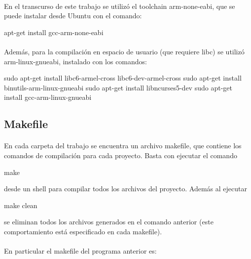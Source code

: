 \documentclass{article}
\begin{document}
\paragraph{}
En el transcurso de este trabajo se utiliz\'o el toolchain arm-none-eabi, que se puede instalar desde Ubuntu con el comando:

\begin{commandshell}
apt-get install gcc-arm-none-eabi
\end{commandshell}

\paragraph{}
Adem\'as, para la compilaci\'on en espacio de usuario (que requiere libc) se utiliz\'o arm-linux-gnueabi, instalado con los comandos:\cite{GNUEabi}

\begin{commandshell}
sudo apt-get install libc6-armel-cross libc6-dev-armel-cross
sudo apt-get install binutils-arm-linux-gnueabi
sudo apt-get install libncurses5-dev
sudo apt-get install gcc-arm-linux-gnueabi
\end{commandshell}

\subsection{Makefile}

\paragraph{}
En cada carpeta del trabajo se encuentra un archivo makefile, que contiene los comandos de compilaci\'on para cada proyecto.\cite{Makefile} Basta con ejecutar el comando

\begin{commandshell}
make
\end{commandshell}

desde un shell para compilar todos los archivos del proyecto. Adem\'as al ejecutar

\begin{commandshell}
make clean
\end{commandshell}

se eliminan todos los archivos generados en el comando anterior (este comportamiento est\'a especificado en cada makefile).

\paragraph{}
En particular el makefile del programa anterior es:
\end{document}
